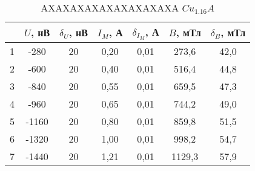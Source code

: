 \begin{table}
\centering
\caption{AXAXAXAXAXAXAXAXAXA $Cu_1.16A$}
\begin{tabular}{|c|c|c|c|c|c|c|}
\hline
 & $U$, нВ & $\delta_U$, нВ & $I_M$, А & $\delta_{I_M}$, А & $B$, мТл & $\delta_B$, мТл \\
\hline
1 & -280 & 20 & 0,20 & 0,01 & 273,6 & 42,0 \\
\cline{1-7}
2 & -600 & 20 & 0,40 & 0,01 & 516,4 & 44,8 \\
\cline{1-7}
3 & -840 & 20 & 0,55 & 0,01 & 659,5 & 47,3 \\
\cline{1-7}
4 & -960 & 20 & 0,65 & 0,01 & 744,2 & 49,0 \\
\cline{1-7}
5 & -1160 & 20 & 0,80 & 0,01 & 859,8 & 51,5 \\
\cline{1-7}
6 & -1320 & 20 & 1,00 & 0,01 & 998,2 & 54,7 \\
\cline{1-7}
7 & -1440 & 20 & 1,21 & 0,01 & 1129,3 & 57,9 \\
\cline{1-7}
\hline
\end{tabular}
\end{table}
